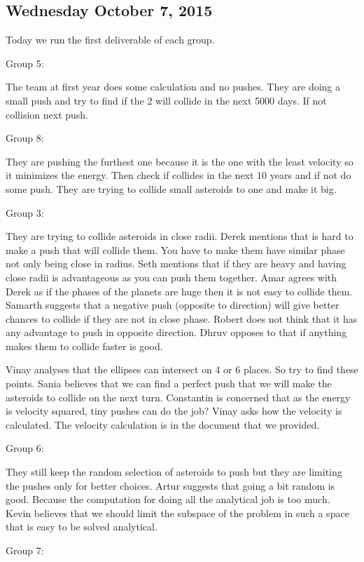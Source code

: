 \subsection{Wednesday October 7, 2015}
Today we run the first deliverable of each group.

Group 5:

The team at first year does some calculation and no pushes. They are doing a small push and try to find if the 2 will collide in the next 5000 days. If not collision next push.

Group 8:

They are pushing the furthest one because it is the one with the least velocity so it minimizes the energy. Then check if collides in the next 10 years and if not do some push. They are trying to collide small asteroids to one and make it big.

Group 3:

They are trying to collide asteroids in close radii. 
Derek mentions that is hard to make a push that will collide them. You have to make them have similar phase not only being close in radius.
Seth mentions that if they are heavy and having close radii is advantageous as you can push them together. 
Amar agrees with Derek as if the phases of the planets are huge then it is not easy to collide them.
Samarth suggests that a negative push (opposite to direction) will give better chances to collide if they are not in close phase.
Robert does not think that it has any advantage to push in opposite direction.
Dhruv opposes to that if anything makes them to collide faster is good.

Vinay analyses that the ellipses can intersect on 4 or 6 places. So try to find these points.
Sania believes that we can find a perfect push that we will make the asteroids to collide on the next turn. 
Constantin is concerned that as the energy is velocity squared, tiny pushes can do the job?
Vinay asks how the velocity is calculated. The velocity calculation is in the document that we provided.

Group 6:

They still keep the random selection of asteroids to push but they are limiting the pushes only for better choices.  
Artur suggests that going a bit random is good. Because the computation for doing all the analytical job is too much.
Kevin believes that we should limit the subspace of the problem in such a space that is easy to be solved analytical. 

Group 7:

